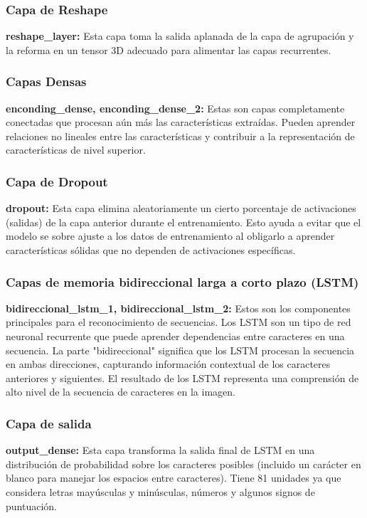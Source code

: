 \documentclass{article}
\begin{document}
\subsubsection{Capa de Reshape}
\textbf{reshape\_layer:} Esta capa toma la salida aplanada de la capa de agrupación y la reforma en un tensor 3D adecuado para alimentar las capas recurrentes.

\subsubsection{Capas Densas}
\textbf{enconding\_dense, enconding\_dense\_2:} Estas son capas completamente conectadas que procesan aún más las características extraídas. Pueden aprender relaciones no lineales entre las características y contribuir a la representación de características de nivel superior.

\subsubsection{Capa de Dropout}
\textbf{dropout:} Esta capa elimina aleatoriamente un cierto porcentaje de activaciones (salidas) de la capa anterior durante el entrenamiento. Esto ayuda a evitar que el modelo se sobre ajuste a los datos de entrenamiento al obligarlo a aprender características sólidas que no dependen de activaciones específicas.

\subsubsection{Capas de memoria bidireccional larga a corto plazo (LSTM)}
\textbf{bidireccional\_lstm\_1, bidireccional\_lstm\_2:} Estos son los componentes principales para el reconocimiento de secuencias. Los LSTM son un tipo de red neuronal recurrente que puede aprender dependencias entre caracteres en una secuencia. La parte "bidireccional" significa que los LSTM procesan la secuencia en ambas direcciones, capturando información contextual de los caracteres anteriores y siguientes. El resultado de los LSTM representa una comprensión de alto nivel de la secuencia de caracteres en la imagen.

\subsubsection{Capa de salida}
\textbf{output\_dense:} Esta capa transforma la salida final de LSTM en una distribución de probabilidad sobre los caracteres posibles (incluido un carácter en blanco para manejar los espacios entre caracteres). Tiene 81 unidades ya que considera letras mayúsculas y minúsculas, números y algunos signos de puntuación.
\end{document}
